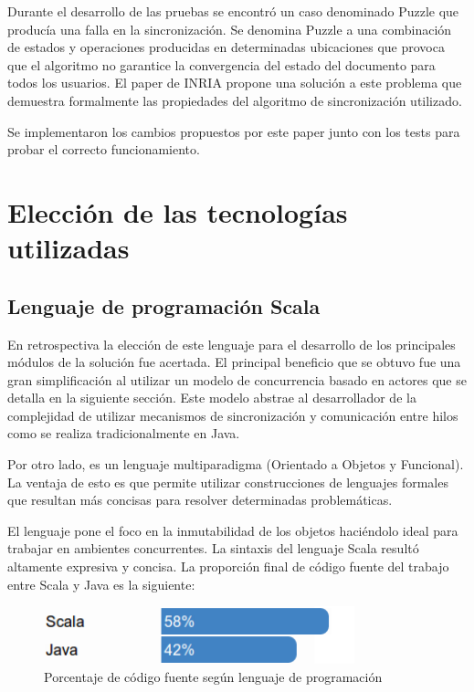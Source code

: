 \documentclass[12pt,a4paper]{article}
\let\stdsection\section
\renewcommand\section{\newpage\stdsection}
\begin{document}
Durante el desarrollo de las pruebas se encontró un caso denominado Puzzle \cite{inria} que producía una falla en la
sincronización. Se denomina Puzzle a una combinación de estados y operaciones producidas en determinadas
ubicaciones que provoca que el algoritmo no garantice la convergencia del estado del documento para todos 
los usuarios. El paper de INRIA \cite{inria} propone una solución a este problema que demuestra formalmente las 
propiedades del algoritmo de sincronización utilizado.

Se implementaron los cambios propuestos por este paper junto con los tests para probar el correcto funcionamiento.

\section{Elección de las tecnologías utilizadas}

\subsection{Lenguaje de programación Scala}
En retrospectiva la elección de este lenguaje para el desarrollo de los principales módulos de la solución fue
acertada. El principal beneficio que se obtuvo fue una gran simplificación al utilizar un modelo de concurrencia
basado en actores \cite{actors1,actors2} que se detalla en la siguiente sección.
Este modelo abstrae al desarrollador de la complejidad de utilizar mecanismos de sincronización y 
comunicación entre hilos como se realiza tradicionalmente en Java.

Por otro lado, es un lenguaje multiparadigma (Orientado a Objetos y Funcional). La ventaja de esto es que permite 
utilizar construcciones de lenguajes formales que resultan más concisas para resolver determinadas problemáticas.

El lenguaje pone el foco en la inmutabilidad de los objetos haciéndolo ideal para trabajar en ambientes concurrentes.
La sintaxis del lenguaje Scala resultó altamente expresiva y concisa. La proporción final de código fuente del trabajo
entre Scala y Java es la siguiente:

	\begin{figure}[!ht]
		\begin{center}
			\includegraphics[width=9cm]{porcentaje.png}
			\caption{\label{porcentaje} Porcentaje de código fuente según lenguaje de programación }
		\end{center}
	\end{figure}
\end{document}
